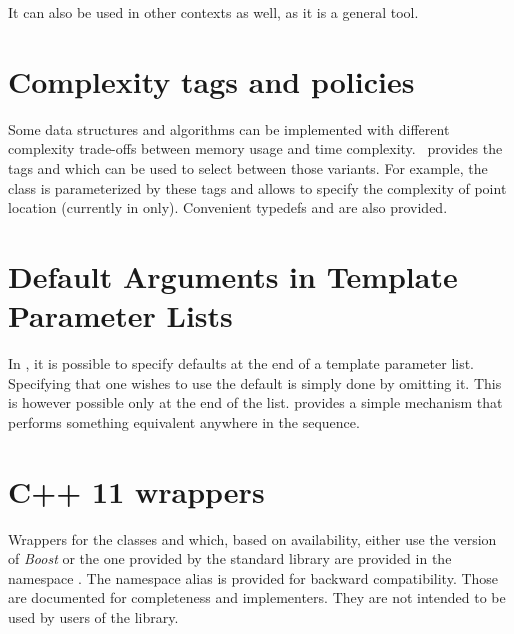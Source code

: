 It can also be used in other contexts as well, as it is a general tool.

\section{Complexity tags and policies}

Some data structures and algorithms can be implemented with different
complexity trade-offs between memory usage and time complexity. \cgal\ provides
the tags  and  which can be used to select between those
variants.  For example, the  class is parameterized by
these tags and allows to specify the complexity of point location (currently in
 only).  Convenient typedefs 
and  are also provided.

\section{Default Arguments in Template Parameter Lists}

In \CC, it is possible to specify defaults at the end of a template parameter
list.  Specifying that one wishes to use the default is simply done by omitting
it.  This is however possible only at the end of the list.  
provides a simple mechanism that performs something equivalent anywhere in the
sequence.

\section{C++ 11 wrappers}

Wrappers for the classes  and  which, based on
availability, either use the version of {\em Boost} or the one
provided by the standard library are provided in the namespace
. The namespace alias  is provided
for backward compatibility. Those are documented for completeness and
implementers. They are not intended to be used by users of the
library.
